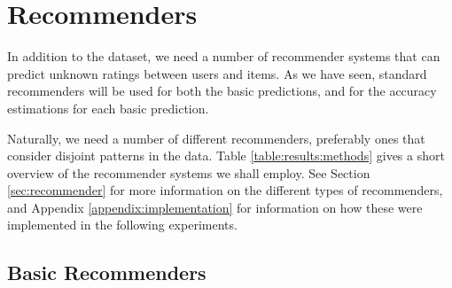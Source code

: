 \section{Recommenders}

In addition to the dataset, we need a number of recommender systems
that can predict unknown ratings between users and items.
As we have seen, standard recommenders will be used for both the basic predictions,
and for the accuracy estimations for each basic prediction.

Naturally, we need a number of different recommenders, preferably ones that consider
disjoint patterns in the data. Table \ref{table:results:methods}
gives a short overview of the recommender systems we shall employ.
See Section \ref{sec:recommender} for more information on the different
types of recommenders, and Appendix \ref{appendix:implementation}
for information on how these were implemented in the following experiments.

\subsection{Basic Recommenders}

